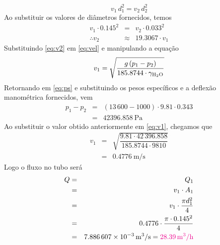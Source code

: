 \documentclass[a4paper, 12pt, brazilian]{article}
\newcommand{\purple}[1]{\textcolor{magenta}{#1}}
\begin{document}
	\begin{equation}
		v_{1}\,d_{1}^{2}=v_{2}\,d_{2}^{2}
	\end{equation}
	Ao substituir os valores de diâmetros fornecidos, temos
	\begin{eqnarray}
		v_{1}\cdot 0.145^{2}&=&v_{2}\cdot 0.033^{2}\\
		\therefore v_{2}&\approx&19.3067\cdot v_{1}\label{eq:v2}
	\end{eqnarray}
	Substituindo \eqref{eq:v2} em \eqref{eq:vel} e manipulando a equação
	\begin{equation}
		\label{eq:v1}
		v_{1}=\sqrt{\dfrac{g\,(p_{1}-p_{2})}{185.8744\cdot\gamma_{\ce{H2O}}}}
	\end{equation}
	Retornando em \eqref{eq:ps} e substituindo os pesos específicos e a deflexão manométrica fornecidos, vem
	\begin{eqnarray}
		p_{1}-p_{2}&=&(13\,600-1000)\cdot 9.81\cdot 0.343\\
				   &=&\SI{42396.858}{\pascal}
	\end{eqnarray}
	Ao substituir o valor obtido anteriormente em \eqref{eq:v1}, chegamos que
	\begin{eqnarray}
		v_{1}&=&\sqrt{\dfrac{9.81\cdot 42\,396.858}{185.8744\cdot 9810}}\\
		 	 &=&\SI{0.4776}{\meter/\second}
	\end{eqnarray}
	Logo o fluxo no tubo será
	\begin{eqnarray}
		Q&=&Q_{1}\\
		 &=&v_{1}\cdot A_{1}\\
		 &=&v_{1}\cdot\dfrac{\pi d_{1}^{2}}{4}\\
		 &=&0.4776\cdot\dfrac{\pi\cdot 0.145^{2}}{4}\\
		 &=&\SI{7.886607e-3}{\meter^{3}/\second}=\purple{\SI{28.39}{\meter^{3}/\hour}}
	\end{eqnarray}
\end{document}
